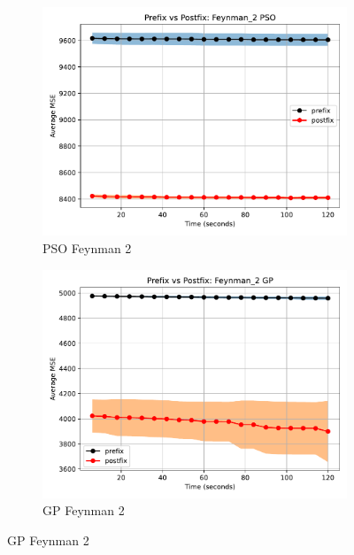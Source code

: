 \documentclass[runningheads]{llncs}
\begin{document}
\begin{figure}
    \vspace{0.5cm}
    
    \begin{subfigure}[b]{0.4\textwidth}
        \includegraphics[width=\linewidth, keepaspectratio]{AIFeynman_Benchmarks/PrePostFeynman_2PSO.pdf}
        \caption{PSO Feynman 2}
        \label{subfig:feynman_2_PSO}
    \end{subfigure}
    \begin{subfigure}[b]{0.4\textwidth}
        \includegraphics[width=\linewidth, keepaspectratio]{AIFeynman_Benchmarks/PrePostFeynman_2GP.pdf}
        \caption{GP Feynman 2}
        \label{subfig:feynman_2_GP}
    \end{subfigure}
    

\end{figure}
\end{document}
